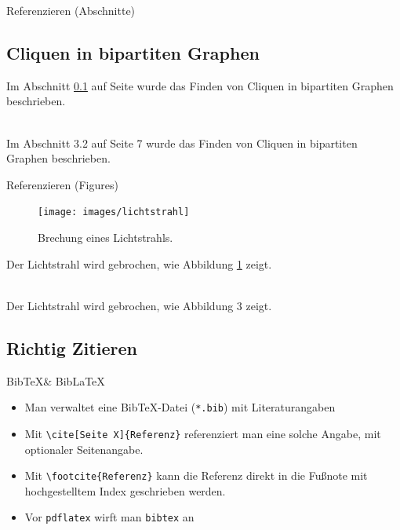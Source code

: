 \documentclass{beamer}
\begin{document}
		\begin{frame}[containsverbatim]{Referenzieren (Abschnitte)}
			\begin{latexcode}
\subsection{Cliquen in bipartiten Graphen}
\label{sec:cliques}

Im Abschnitt \ref{sec:cliques} auf Seite
\pageref{sec:cliques} wurde das Finden von
Cliquen in bipartiten Graphen beschrieben.
			\end{latexcode}
			\vspace{0.5cm}
			\slideheading{Ergebnis:}\\
			Im Abschnitt 3.2 auf Seite 7 wurde das Finden
			von Cliquen in bipartiten Graphen beschrieben.
		\end{frame}


		\begin{frame}[containsverbatim]{Referenzieren (Figures)}
			\slideheading{\LaTeX-Code:}
			\begin{latexcode}
\begin{figure}[t]
	\texttt{[image: images/lichtstrahl]}
	\caption{Brechung eines Lichtstrahls.}
	\label{fig:lichtbrechung} %
\end{figure}

Der Lichtstrahl wird gebrochen, wie
Abbildung \ref{fig:lichtbrechung} zeigt.
			\end{latexcode}
			\vspace{0.5cm}
			\\
			Der Lichtstrahl wird gebrochen, wie Abbildung 3 zeigt.
		\end{frame}


		\subsection{Richtig Zitieren}

		\begin{frame}[containsverbatim]{Bib\TeX \& Bib\LaTeX}
			\begin{itemize}
				\item Man verwaltet eine Bib\TeX{}-Datei (\texttt{*.bib}) mit Literaturangaben
				\item Mit \texttt{\textbackslash{}cite[Seite X]\{Referenz\}} referenziert man eine solche Angabe, mit optionaler Seitenangabe.
				\item Mit \texttt{\textbackslash{}footcite\{Referenz\}} kann die Referenz direkt in die Fußnote mit hochgestelltem Index geschrieben werden.
				\item Vor \texttt{pdflatex} wirft man \texttt{bibtex} an
			\end{itemize}
		\end{frame}
		
\end{document}
